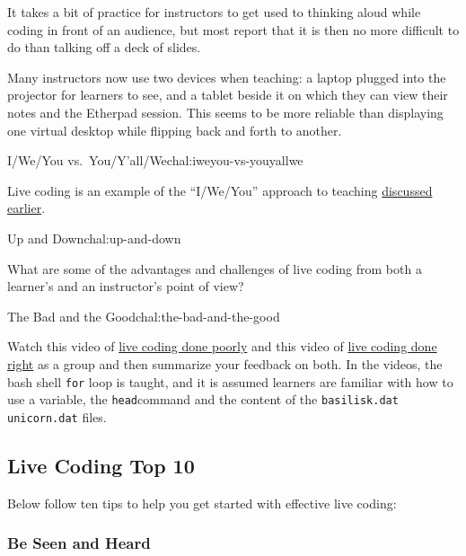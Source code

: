 It takes a bit of practice for instructors to get used to thinking aloud
while coding in front of an audience, but most report that it is then no
more difficult to do than talking off a deck of slides.

Many instructors now use two devices when teaching: a laptop plugged
into the projector for learners to see, and a tablet beside it on which
they can view their notes and the Etherpad session. This seems to be
more reliable than displaying one virtual desktop while flipping back
and forth to another.

\begin{challenge}{I/We/You vs.~You/Y'all/We}{chal:iweyou-vs-youyallwe}

Live coding is an example of the ``I/We/You'' approach to teaching
\href{\{\{\%20page.root\%20\}\}/05-performance/}{discussed earlier}.
\end{challenge}

\begin{challenge}{Up and Down}{chal:up-and-down}

What are some of the advantages and challenges of live coding from both
a learner's and an instructor's point of view?
\end{challenge}

\begin{challenge}{The Bad and the Good}{chal:the-bad-and-the-good}

Watch this video of \href{https://youtu.be/bXxBeNkKmJE}{live coding done
poorly} and this video of \href{https://youtu.be/SkPmwe\_WjeY}{live
coding done right} as a group and then summarize your feedback on both.
In the videos, the bash shell \texttt{for} loop is taught, and it is
assumed learners are familiar with how to use a variable, the
\texttt{head}command and the content of the
\texttt{basilisk.dat unicorn.dat} files.
\end{challenge}

\subsection{Live Coding Top 10}\label{live-coding-top-10}

Below follow ten tips to help you get started with effective live
coding:

\subsubsection{Be Seen and Heard}\label{be-seen-and-heard}

